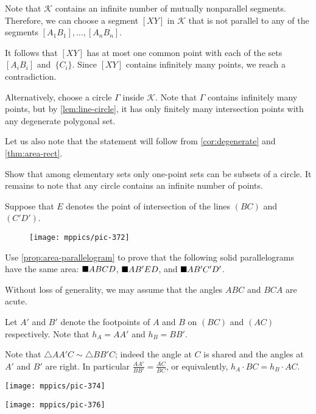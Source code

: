 Note that \( \mathcal{K} \) contains an infinite number of mutually nonparallel segments.
Therefore, we can choose a segment \( [XY] \) in \( \mathcal{K} \) that is not parallel to any of the segments \( [A_1B_1],\dots,[A_nB_n] \).

It follows that \( [XY] \) has at most one common point with each of the sets \( [A_iB_i] \) and~\( \{C_i\} \).
Since \( [XY] \) contains infinitely many points, we reach a contradiction.

\smallskip

Alternatively, choose a circle \( \Gamma \) inside \( \mathcal{K} \).
Note that \( \Gamma \) contains infinitely many points, but by \ref{lem:line-circle}, it has only finitely many intersection points with any degenerate polygonal set.

Let us also note that the statement will follow from \ref{cor:degenerate} and \ref{thm:area-rect}.

Show that among elementary sets
only one-point sets can be subsets of a circle.
It remains to note that any circle contains an infinite number of points.

Suppose that $E$ denotes the point of intersection of the lines $(BC)$ and~$(C'D')$.

\begin{wrapfigure}[7]{r}{28mm}
\vskip-2mm
\centering
\texttt{[image: mppics/pic-372]}
\end{wrapfigure}

Use \ref{prop:area-parallelogram} to prove that the following solid parallelograms have the same area:
$\blacksquare ABCD$, $\blacksquare AB'ED$, and $\blacksquare AB'C'D'$.

Without loss of generality, we may assume that the angles $ABC$ and $BCA$ are acute.

Let $A'$ and $B'$ denote the footpoints of $A$ and $B$ on $(BC)$ and $(AC)$ respectively.
Note that $h_A=AA'$ and $h_B=BB'$.

Note that $\triangle AA'C\sim \triangle BB'C$;
indeed the angle at $C$ is shared and the angles at $A'$ and $B'$ are right.
In particular
$\frac{AA'}{BB'}=\frac{AC}{BC}$,
or equivalently, $h_A\cdot BC=h_B\cdot AC$.

\begin{Figure}
\vskip-0mm
\begin{minipage}{.49\textwidth}
\centering
\texttt{[image: mppics/pic-374]}
\end{minipage}
\hfill
\begin{minipage}{.49\textwidth}
\centering
\texttt{[image: mppics/pic-376]}
\end{minipage}
\end{Figure}

